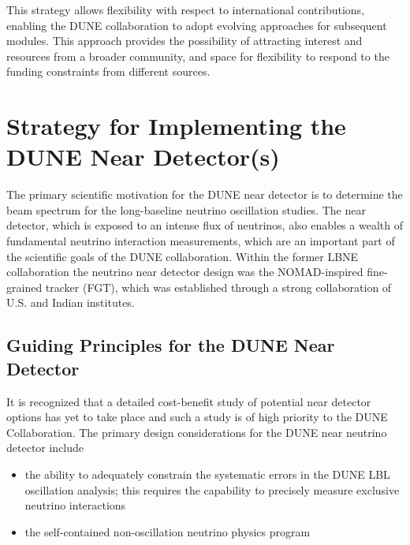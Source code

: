This strategy allows flexibility with respect to international contributions, 
enabling the DUNE collaboration to
adopt evolving approaches for subsequent modules. This approach provides the possibility of attracting interest 
and resources from a broader community, and space for flexibility to respond to 
the funding constraints from different sources. 

\section{Strategy for Implementing the DUNE Near Detector(s)}
\label{v1ch:strategyND}

 The primary scientific motivation for 
the DUNE near detector %
is to determine the beam spectrum for the long-baseline 
neutrino oscillation studies. The near detector, which is exposed to an intense 
flux of neutrinos, also enables a wealth of fundamental neutrino 
interaction measurements, which are an important part of the  scientific 
goals of the DUNE collaboration. Within the former LBNE collaboration the neutrino 
near detector design was the NOMAD-inspired fine-grained tracker (FGT), which 
was established through a strong collaboration of U.S. and Indian institutes.


\subsection{Guiding Principles for the DUNE Near Detector}

It is recognized that a detailed cost-benefit study of potential near detector options 
has yet to take place and such a study is of high priority to the DUNE Collaboration. The
primary design considerations for the DUNE near neutrino detector include
\begin{itemize}
\item  %
the 
ability to adequately constrain the systematic errors in the DUNE LBL oscillation 
analysis; this requires the capability to precisely measure exclusive neutrino
interactions

\item %
the self-contained non-oscillation 
neutrino physics program

\end{itemize}


